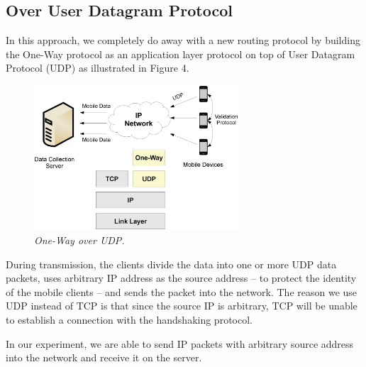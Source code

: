 \subsection{Over User Datagram Protocol}
In this approach, we completely do away with a new routing protocol by building
the One-Way protocol as an application layer protocol on top of User Datagram
Protocol (UDP) as illustrated in Figure 4.

\begin{figure}[h]
\begin{center}
\includegraphics[width=3in]{figure4.eps}
\caption{\small \sl One-Way over UDP.\label{fig:Stupendous}}
\end{center}
\end{figure}

During transmission, the clients divide the data into one or more UDP data packets,
uses arbitrary IP address as the source address -- to protect the identity of the
mobile clients -- and sends the packet into the network.
The reason we use UDP instead of TCP is that since the source IP is arbitrary, TCP
will be unable to establish a connection with the handshaking protocol.

In our experiment, we are able to send IP packets with arbitrary source address into
the network and receive it on the server.




